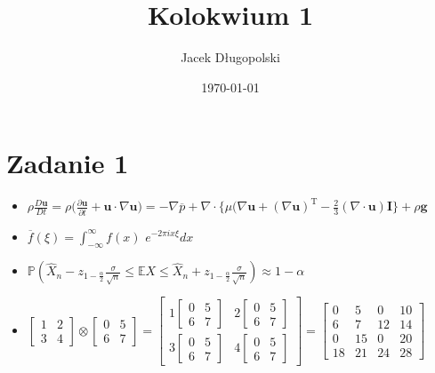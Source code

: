 \documentclass{article}
\author{Jacek Długopolski}
\title{Kolokwium 1}
\date{\today}
\begin{document}
\maketitle

\section*{Zadanie 1}
\begin{itemize}
\item$\rho \frac{D\textbf{u}}{Dt} = \rho \big( \frac{\partial\textbf{u}}{\partial t} + \textbf{u} \cdot \nabla \textbf{u})=-\nabla \overline{p}+\nabla\cdot\{\mu(\nabla \textbf{u}+(\nabla \textbf{u})^\text{T}-\frac{2}{3}(\nabla\cdot \textbf{u})\textbf{I}\}+ \rho\textbf{g}$

\item$\overline{f}(\xi)=\int_{-\infty}^{\infty} f(x)$ $e^{-2\pi ix\xi}dx$

\item$\mathbb{P}(\hat{X}_{n}-z_{1-\frac{\alpha}{2}}\frac{\sigma}{\sqrt{n}}\le \mathbb{E}X \le\hat{X}_{n}+z_{1-\frac{\alpha}{2}}\frac{\sigma}{\sqrt{n}})\approx 1 -\alpha$

\item$\begin{bmatrix}1&2\\3&4\end{bmatrix} \otimes\begin{bmatrix}0&5\\6&7\end{bmatrix}=\begin{bmatrix}1\begin{bmatrix}0&5\\6&7\end{bmatrix}&
2\begin{bmatrix}0&5\\6&7\end{bmatrix}\\3\begin{bmatrix}0&5\\6&7\end{bmatrix}&4\begin{bmatrix}0&5\\6&7\end{bmatrix} \end{bmatrix}=
\begin{bmatrix}0&5&0&10\\6&7&12&14\\0&15&0&20\\18&21&24&28\end{bmatrix}$
\end{itemize}
\end{document}
